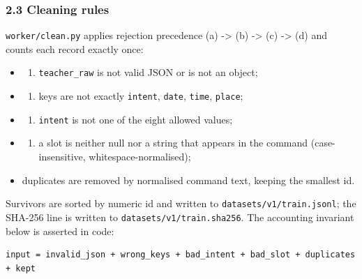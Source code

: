 \documentclass[
]{article}
\providecommand{\tightlist}{%
  \setlength{\itemsep}{0pt}\setlength{\parskip}{0pt}}
\begin{document}
\hypertarget{cleaning-rules}{%
\subsubsection{2.3 Cleaning rules}\label{cleaning-rules}}

\texttt{worker/clean.py} applies rejection precedence (a)
-\textgreater{} (b) -\textgreater{} (c) -\textgreater{} (d) and counts
each record exactly once:

\begin{itemize}
\item
  \begin{enumerate}
  \def\labelenumi{(\alph{enumi})}
  \tightlist
  \item
    \texttt{teacher\_raw} is not valid JSON or is not an object;
  \end{enumerate}
\item
  \begin{enumerate}
  \def\labelenumi{(\alph{enumi})}
  \setcounter{enumi}{1}
  \tightlist
  \item
    keys are not exactly \texttt{intent}, \texttt{date}, \texttt{time},
    \texttt{place};
  \end{enumerate}
\item
  \begin{enumerate}
  \def\labelenumi{(\alph{enumi})}
  \setcounter{enumi}{2}
  \tightlist
  \item
    \texttt{intent} is not one of the eight allowed values;
  \end{enumerate}
\item
  \begin{enumerate}
  \def\labelenumi{(\alph{enumi})}
  \setcounter{enumi}{3}
  \tightlist
  \item
    a slot is neither null nor a string that appears in the command
    (case-insensitive, whitespace-normalised);
  \end{enumerate}
\item
  duplicates are removed by normalised command text, keeping the
  smallest id.
\end{itemize}

Survivors are sorted by numeric id and written to
\texttt{datasets/v1/train.jsonl}; the SHA-256 line is written to
\texttt{datasets/v1/train.sha256}. The accounting invariant below is
asserted in code:

\begin{verbatim}
input = invalid_json + wrong_keys + bad_intent + bad_slot + duplicates + kept
\end{verbatim}
\end{document}
